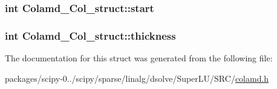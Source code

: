 \subsubsection[{start}]{\setlength{\rightskip}{0pt plus 5cm}int Colamd\+\_\+\+Col\+\_\+struct\+::start}\label{structColamd__Col__struct_a55c862b22c87023300b5ccb3044e0409}
\hypertarget{structColamd__Col__struct_aa52760c0c184f617d10b9946618ebc9b}{}
\subsubsection[{thickness}]{\setlength{\rightskip}{0pt plus 5cm}int Colamd\+\_\+\+Col\+\_\+struct\+::thickness}\label{structColamd__Col__struct_aa52760c0c184f617d10b9946618ebc9b}


The documentation for this struct was generated from the following file\+:\begin{DoxyCompactItemize}
\item 
packages/scipy-\/0../scipy/sparse/linalg/dsolve/\+Super\+L\+U/\+S\+R\+C/\hyperlink{colamd_8h}{colamd.\+h}\end{DoxyCompactItemize}

